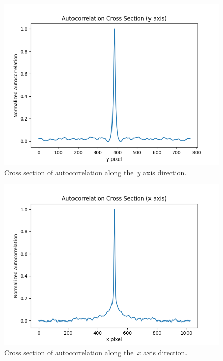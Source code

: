 \documentclass[final]{cvpr}
\begin{document}
\begin{figure}[t]
	\centering
	\includegraphics[width=1.0\linewidth]{images/autocorrelation-cross-section-y-axis-2mm-spacing}
	\caption{\label{fig:autocorrelation-cross-section-y-axis-2mm-spacing}
		Cross section of autocorrelation along the~$y$ axis direction.}
\end{figure}


\begin{figure}[t]
	\centering
	\includegraphics[width=1.0\linewidth]{images/autocorrelation-cross-section-x-axis-2mm-spacing}
	\caption{\label{fig:autocorrelation-cross-section-x-axis-2mm-spacing}
		Cross section of autocorrelation along the~$x$ axis direction.}
\end{figure}
\end{document}
